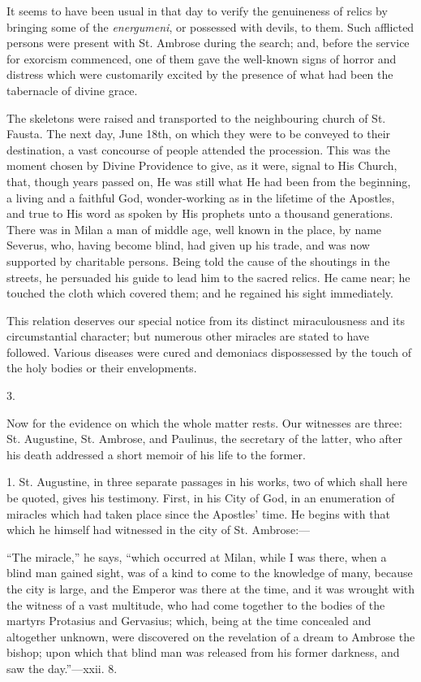 It seems to have been usual in that day to verify the genuineness
of relics by bringing some of the \emph{energumeni}, or possessed with
devils, to them. Such afflicted persons were present with St. Ambrose
during the search; and, before the service for exorcism commenced, one
of them gave the well-known signs of horror and distress which were
customarily excited by the presence of what had been the tabernacle of
divine grace.

The skeletons were raised and transported to the neighbouring
church of St. Fausta. The next day, June 18th, on which they were to
be conveyed to their destination, a vast concourse of people attended
the procession. This was the moment chosen by Divine Providence to
give, as it were, signal to His Church, that, though years passed on,
He was still what He had been from the beginning, a living and a
faithful God, wonder-working as in the lifetime of the Apostles, and
true to His word as spoken by His prophets unto a thousand
generations. There was in Milan a man of middle age, well known in the
place, by name Severus, who, having become blind, had given up his
trade, and was now supported by charitable persons. Being told the
cause of the shoutings in the streets, he persuaded his guide to lead
him to the sacred relics. He came near; he touched the cloth which
covered them; and he regained his sight immediately.

This relation deserves our special notice from its distinct
miraculousness and its circumstantial character; but numerous other
miracles are stated to have followed. Various diseases were cured and
demoniacs dispossessed by the touch of the holy bodies or their
envelopments.

3.

Now for the evidence on which the whole matter rests. Our witnesses
are three: St. Augustine, St. Ambrose, and Paulinus, the secretary of
the latter, who after his death addressed a short memoir of his life
to the former.

1. St. Augustine, in three separate passages in his works, two of
which shall here be quoted, gives his testimony. First, in his City of
God, in an enumeration of miracles which had taken place since the
Apostles' time. He begins with that which he himself had witnessed in
the city of St. Ambrose:—

``The miracle,'' he says, ``which occurred at Milan,
while I was there, when a blind man gained sight, was of a kind to
come to the knowledge of many, because the city is large, and the
Emperor was there at the time, and it was wrought with the witness of
a vast multitude, who had come together to the bodies of the martyrs
Protasius and Gervasius; which, being at the time concealed and
altogether unknown, were discovered on the revelation of a dream to
Ambrose the bishop; upon which that blind man was released from his
former darkness, and saw the day.''—xxii. 8.

